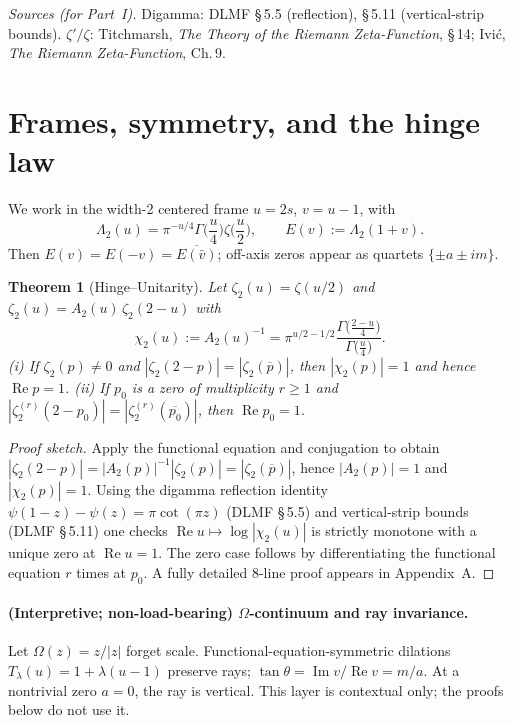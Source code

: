 \documentclass[11pt]{article}
\numberwithin{equation}{section}
\newtheorem{theorem}{Theorem}[section]
\theoremstyle{remark}
\DeclareMathOperator{\Imag}{Im}
\DeclareMathOperator{\Real}{Re}
\newcommand{\LamTwo}{\Lambda_2}
\newcommand{\chiTwo}{\chi_2}
\begin{document}
\medskip
\noindent\textit{Sources (for Part~I).} Digamma: DLMF §\,5.5 (reflection), §\,5.11 (vertical-strip bounds). $\zeta'/\zeta$: Titchmarsh, \textit{The Theory of the Riemann Zeta-Function}, §\,14; Ivi\'c, \textit{The Riemann Zeta-Function}, Ch.\,9.

\section{Frames, symmetry, and the hinge law}\label{sec:frames}

We work in the width-2 centered frame $u=2s$, $v=u-1$, with
\[
\LamTwo(u)=\pi^{-u/4}\Gamma\!\Big(\frac{u}{4}\Big)\zeta\!\Big(\frac{u}{2}\Big),
\qquad
E(v):=\LamTwo(1+v).
\]
Then $E(v)=E(-v)=\overline{E(\bar v)}$; off-axis zeros appear as quartets $\{\pm a\pm im\}$.

\begin{theorem}[Hinge--Unitarity]\label{thm:hinge}
Let $\zeta_2(u)=\zeta(u/2)$ and $\zeta_2(u)=A_2(u)\,\zeta_2(2-u)$ with
\[
\chiTwo(u):=A_2(u)^{-1}=\pi^{u/2-1/2}\frac{\Gamma\big(\frac{2-u}{4}\big)}{\Gamma\big(\frac{u}{4}\big)}.
\]
\emph{(i)} If $\zeta_2(p)\ne 0$ and $|\zeta_2(2-p)|=|\zeta_2(\overline p)|$, then $|\chiTwo(p)|=1$ and hence $\Real p=1$. \;
\emph{(ii)} If $p_0$ is a zero of multiplicity $r\ge1$ and $|\zeta_2^{(r)}(2-p_0)|=|\zeta_2^{(r)}(\overline{p_0})|$, then $\Real p_0=1$.
\end{theorem}

\begin{proof}[Proof sketch]
Apply the functional equation and conjugation to obtain $|\zeta_2(2-p)|=|A_2(p)|^{-1}|\zeta_2(p)|=|\zeta_2(\overline p)|$, hence $|A_2(p)|=1$ and $|\chiTwo(p)|=1$. Using the digamma reflection identity $\psi(1-z)-\psi(z)=\pi\cot(\pi z)$ (DLMF §\,5.5) and vertical-strip bounds (DLMF §\,5.11) one checks $\Real u\mapsto\log|\chiTwo(u)|$ is strictly monotone with a unique zero at $\Real u=1$. The zero case follows by differentiating the functional equation $r$ times at $p_0$. A fully detailed 8-line proof appears in Appendix~A.
\end{proof}

\paragraph{(Interpretive; non-load-bearing) $\Omega$-continuum and ray invariance.}
Let $\Omega(z)=z/|z|$ forget scale. Functional-equation-symmetric dilations $T_\lambda(u)=1+\lambda(u-1)$ preserve rays; $\tan\theta=\Imag v/\Real v=m/a$. At a nontrivial zero $a=0$, the ray is vertical. This layer is contextual only; the proofs below do not use it.
\end{document}
